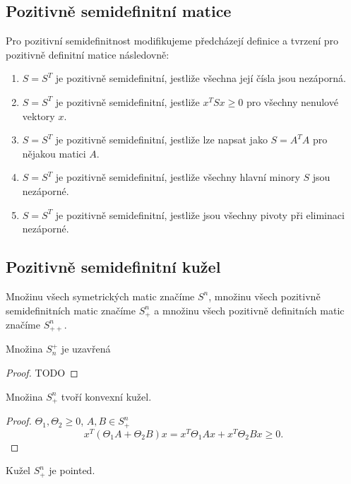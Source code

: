 \subsection*{Pozitivně semidefinitní matice}

Pro pozitivní semidefinitnost modifikujeme předcházejí definice a tvrzení pro pozitivně definitní matice následovně:
\begin{enumerate}
    \item $S = S^T$ je pozitivně semidefinitní, jestliže všechna její čísla jsou nezáporná.
    \item $S = S^T$ je pozitivně semidefinitní, jestliže $x^TSx \geq 0$ pro všechny nenulové vektory $x$.
    \item $S = S^T$ je pozitivně semidefinitní, jestliže lze napsat jako $S = A^T A$ pro nějakou matici $A$.
    \item $S = S^T$ je pozitivně semidefinitní, jestliže všechny hlavní minory $S$ jsou nezáporné.
    \item $S = S^T$ je pozitivně semidefinitní, jestliže jsou všechny pivoty při eliminaci nezáporné.
\end{enumerate}

\subsection*{Pozitivně semidefinitní kužel}

Množinu všech symetrických matic značíme $S^n$, množinu všech pozitivně semidefinitních matic značíme $S_+^n$ a množinu všech pozitivně definitních matic značíme $S_{++}^n$.

\begin{lm}
    Množina $S_n^+$ je uzavřená
\end{lm}

\begin{proof}
    TODO
\end{proof}

\begin{lm}
    Množina $S_+^n$ tvoří konvexní kužel.
\end{lm}

\begin{proof}
    $\Theta_1, \Theta_2 \geq 0$, $A, B \in S_+^n$
    $$
        x^T \left( \Theta_1 A + \Theta_2 B \right) x = x^T \Theta_1 A x + x^T \Theta_2 B x \geq 0.
    $$
\end{proof}

\begin{lm}
    Kužel $S_+^n$ je pointed.
\end{lm}

